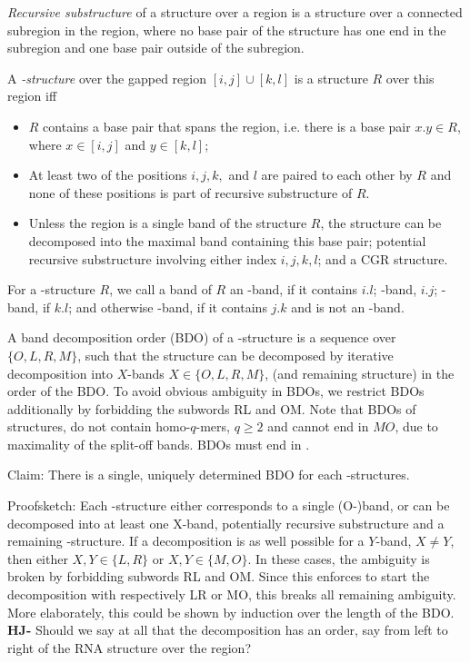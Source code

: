 \documentclass[11pt]{article} %
\newcommand{\Ob}{\text{O}}
\newcommand{\Rb}{\text{R}}
\newcommand{\Lb}{\text{L}}
\newcommand{\Mb}{\text{M}}
\begin{document}
\emph{Recursive substructure} of a structure over a region is a structure over a connected subregion in the region, where no base pair of the structure has one end in the subregion and one base pair outside of the subregion.

A \emph{\CGR-structure} over the gapped region $[i,j]\cup[k,l]$ is a structure $R$ over this region iff
\begin{itemize}
  \item $R$ contains a base pair that spans the region, i.e. there is a base pair $x.y\in R$, where $x\in[i,j]$ and $y\in[k,l]$;
  \item At least two of the positions $i,j,k,$ and $l$ are paired to each other by $R$ and
    none of these positions is part of recursive substructure of $R$.
  \item Unless the region is a single band of the structure $R$, the structure 
    can be decomposed into the maximal band containing this base pair;
    potential recursive substructure involving either index $i,j,k,l$; 
    and a CGR structure.
\end{itemize}
For a \CGR-structure $R$, we call a band of $R$ an \Ob-band, if it contains $i.l$; \Lb-band, $i.j$; \Rb-band, if $k.l$; and otherwise \Mb-band, if it contains $j.k$ and is not an \Ob-band.

A band decomposition order (BDO) of a \CGR-structure is a sequence over $\{O,L,R,M\}$, such that the structure can be decomposed by iterative decomposition into $X$-bands $X \in \{O,L,R,M\}$, (and remaining structure) in the order of the BDO.
To avoid obvious ambiguity in BDOs, we restrict BDOs additionally by forbidding the subwords RL and OM. Note that BDOs of structures, do not contain homo-$q$-mers, $q\geq 2$ and cannot end in $MO$, due to maximality of the split-off bands. BDOs must end in \Ob{}.

Claim: There is a single, uniquely determined  BDO for each \CGR-structures.

Proofsketch: Each \CGR-structure either corresponds to a single (O-)band, or can be decomposed into at least one X-band, potentially recursive substructure and a remaining \CGR-structure. If a decomposition is as well possible for a $Y$-band, $X\neq Y$, then either $X,Y\in\{L,R\}$ or $X,Y\in\{M,O\}$. In these cases, the ambiguity is broken by forbidding subwords RL and OM. Since this enforces to start the decomposition with respectively LR or MO, this breaks all remaining ambiguity. More elaborately, this could be shown by induction over the length of the BDO.\\
\textbf{HJ-} Should we say at all that the decomposition has an order, say from left to right of the RNA structure over the region?
\end{document}
